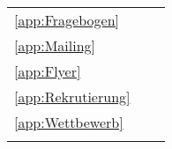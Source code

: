 \begin{table}[ht]
\begin{tabular}{l m{27em}  r}
  \ref{app:Fragebogen} & \nameref{app:Fragebogen} & \pageref{app:Fragebogen}\\
  \ref{app:Mailing} & \nameref{app:Mailing} & \pageref{app:Mailing}\\
  \ref{app:Flyer} & \nameref{app:Flyer} & \pageref{app:Flyer}\\
  \ref{app:Rekrutierung} & \nameref{app:Rekrutierung} & \pageref{app:Rekrutierung}\\
  \ref{app:Wettbewerb} & \nameref{app:Wettbewerb} & \pageref{app:Wettbewerb}\\
  \hline
  &&\\
\end{tabular}
\end{table}
